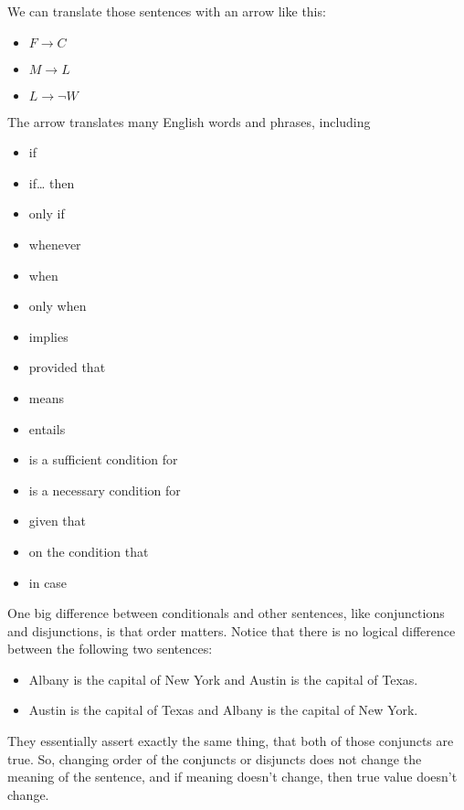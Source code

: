 We can translate those sentences with an arrow like this:

\begin{itemize}

\item
  \(F \rightarrow C\)
\item
  \(M \rightarrow L\)
\item
  \(L \rightarrow \neg W\)
\end{itemize}

The arrow translates many English words and phrases, including

\begin{itemize}

\item
  if
\item
  if\ldots{} then
\item
  only if
\item
  whenever
\item
  when
\item
  only when
\item
  implies
\item
  provided that
\item
  means
\item
  entails
\item
  is a sufficient condition for
\item
  is a necessary condition for
\item
  given that
\item
  on the condition that
\item
  in case
\end{itemize}

One big difference between conditionals and other sentences, like conjunctions and disjunctions, is that order matters. Notice that there is no logical difference between the following two sentences:

\begin{itemize}

\item
  Albany is the capital of New York and Austin is the capital of Texas.
\item
  Austin is the capital of Texas and Albany is the capital of New York.
\end{itemize}

They essentially assert exactly the same thing, that both of those conjuncts are true. So, changing order of the conjuncts or disjuncts does not change the meaning of the sentence, and if meaning doesn't change, then true value doesn't change.

